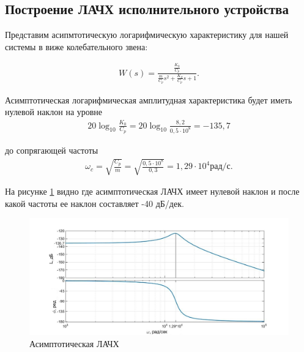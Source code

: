 \documentclass[a4paper, 12pt]{article}
\begin{document}
\begin{center}
	\section{Построение ЛАЧХ исполнительного устройства}
\end{center}\par

Представим асипмтотическую логарифмическую характеристику для нашей системы в виже колебательного звена:

\begin{align}
	W(s) = \frac{\displaystyle{\frac{K_0}{C_p}}}{\displaystyle{\frac{m}{C_p}}s^2 + \frac{K_d}{C_p}s + 1}.
\end{align}\par
Асимптотическая логарифмическая амплитудная характеристика будет иметь нулевой наклон на уровне
\begin{align}
	20\log_{10} \frac{K_0}{C_p} = 20\log_{10} \frac{8,2}{0,5\cdot10^8} = -135,7
\end{align}\par
до сопрягающей частоты 
\begin{align}
	\omega_c = \sqrt{\frac{C_p}{m}} = \sqrt{\frac{0,5\cdot10^8}{0,3}} = 1,29\cdot10^4 \text{рад/с}.
\end{align}

На рисунке \ref{lachx} видно где асимптотическая ЛАЧХ имеет нулевой наклон и после какой частоты ее наклон составляет -40 дБ/дек.

\begin{figure}[h!]
	\centering
	\includegraphics[width = 0.65\textheight]{data/lachx}
	\caption{Асимптотическая ЛАЧХ}
	\label{lachx}
\end{figure}

\newpage
\end{document}
